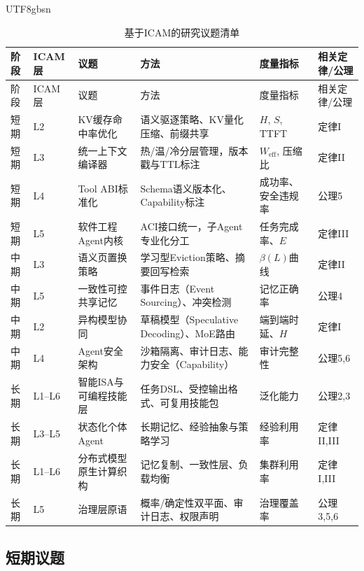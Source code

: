 \documentclass[11pt,a4paper]{article}
\begin{document}
\begin{CJK*}{UTF8}{gbsn}
\footnotesize
\renewcommand{\arraystretch}{1.35}
\begin{longtable}{p{}p{}p{}p{}p{}p{}}
\caption{基于ICAM的研究议题清单}
\label{tab:roadmap}\\
\toprule
阶段 & ICAM层 & 议题 & 方法 & 度量指标 & 相关定律/公理 \\
\midrule
\endfirsthead
\toprule
阶段 & ICAM层 & 议题 & 方法 & 度量指标 & 相关定律/公理 \\
\midrule
\endhead
短期 & L2 & KV缓存命中率优化 & 语义驱逐策略、KV量化压缩、前缀共享 & $H$, $S$, TTFT & 定律I \\[3pt]
短期 & L3 & 统一上下文编译器 & 热/温/冷分层管理，版本戳与TTL标注 & $W_{\mathrm{eff}}$, 压缩比 & 定律II \\[3pt]
短期 & L4 & Tool ABI标准化 & Schema语义版本化、Capability标注 & 成功率、安全违规率 & 公理5 \\[3pt]
短期 & L5 & 软件工程Agent内核 & ACI接口统一，子Agent专业化分工 & 任务完成率、$E$ & 定律III \\[3pt]
中期 & L3 & 语义页置换策略 & 学习型Eviction策略、摘要回写检索 & $\beta(L)$曲线 & 定律II \\[3pt]
中期 & L5 & 一致性可控共享记忆 & 事件日志（Event Sourcing）、冲突检测 & 记忆正确率 & 公理4 \\[3pt]
中期 & L2 & 异构模型协同 & 草稿模型（Speculative Decoding）、MoE路由 & 端到端时延、$H$ & 定律I \\[3pt]
中期 & L4 & Agent安全架构 & 沙箱隔离、审计日志、能力安全（Capability） & 审计完整性 & 公理5,6 \\[3pt]
长期 & L1--L6 & 智能ISA与可编程技能层 & 任务DSL、受控输出格式、可复用技能包 & 泛化能力 & 公理2,3 \\[3pt]
长期 & L3--L5 & 状态化个体Agent & 长期记忆、经验抽象与策略学习 & 经验利用率 & 定律II,III \\[3pt]
长期 & L1--L6 & 分布式模型原生计算织构 & 记忆复制、一致性层、负载均衡 & 集群利用率 & 定律I,III \\[3pt]
长期 & L5 & 治理层原语 & 概率/确定性双平面、审计日志、权限声明 & 治理覆盖率 & 公理3,5,6 \\
\bottomrule
\end{longtable}
\renewcommand{\arraystretch}{1.0}
\normalsize

\subsection{短期议题}


\end{CJK*}
\end{document}
